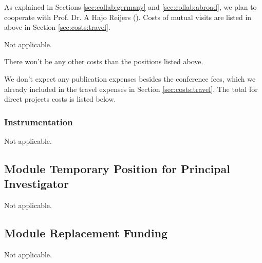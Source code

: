 
As explained in Sections \ref{sec:collab:germany} and \ref{sec:collab:abroad}, we plan to cooperate with Prof. Dr. A Hajo Reijers (). Costs of mutual visits are listed in above in Section \ref{sec:costs:travel}.


Not applicable. 


There won't be any other costs than the positions listed above. 


We don't expect any publication expenses besides the conference fees, which we already included in the travel expenses in Section \ref{sec:costs:travel}. The total for direct projects costs is listed below. 

\subsubsection{Instrumentation}

Not applicable. 

\subsection{Module Temporary Position for Principal Investigator}

Not applicable. 

\subsection{Module Replacement Funding}

Not applicable. 